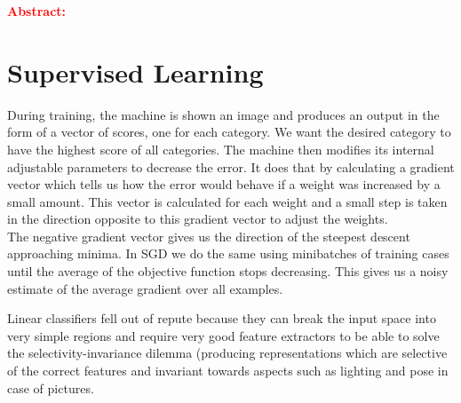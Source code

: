 \textcolor{red}{\textbf{Abstract:}  }

\section*{Supervised Learning}

 During training, the machine is shown an image and produces an output in the form of a vector of scores, one for each category. We want the desired category to have the highest score of all categories. The machine then modifies its internal adjustable parameters to decrease the error. It does that by calculating a gradient vector which tells us how the error would behave if a weight was increased by a small amount. This vector is calculated for each weight and a small step is taken in the direction opposite to this gradient vector to adjust the weights.\\
 
 The negative gradient vector gives us the direction of the steepest descent approaching minima. In SGD we do the same using minibatches of training cases until the average of the objective function stops decreasing. This gives us a noisy estimate of the average gradient over all examples.
 
 Linear classifiers fell out of repute because they can break the input space into very simple regions and require very good feature extractors to be able to solve the selectivity-invariance dilemma (producing representations which are selective of the correct features and invariant towards aspects such as lighting and pose in case of pictures.